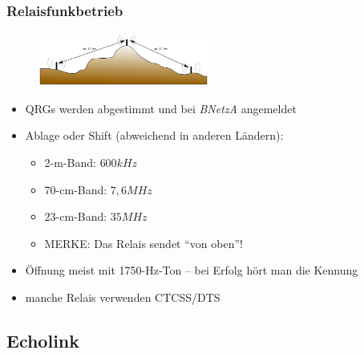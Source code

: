 \begin{frame}
  \frametitle{Relaisfunkbetrieb}

  \begin{center}
    \begin{figure}
      \includegraphics[width=0.5\textwidth,height=.3\textheight,keepaspectratio]{bv11/Relaisstelle.png}
    \end{figure}
  \end{center}

  \begin{itemize}
    \item QRGs werden abgestimmt und bei \emph{BNetzA} angemeldet
    \item Ablage oder Shift (abweichend in anderen Ländern):
      \begin{itemize}
        \item 2-m-Band: $600 kHz$
        \item 70-cm-Band: $7,6 MHz$
        \item 23-cm-Band: $35 MHz$
        \item MERKE: Das Relais sendet ``von oben''!
      \end{itemize}
    \item Öffnung meist mit 1750-Hz-Ton -- bei Erfolg hört man die Kennung
    \item manche Relais verwenden CTCSS/DTS
  \end{itemize}

\end{frame}

\subsection{Echolink}

